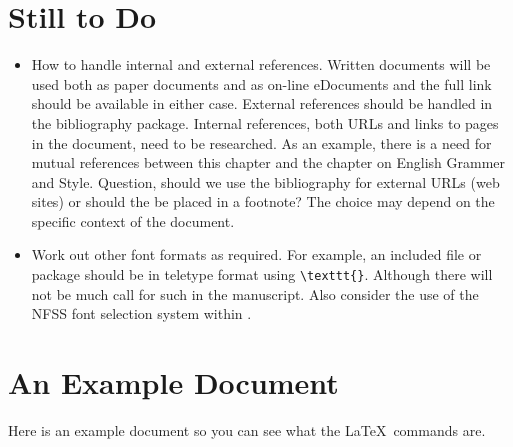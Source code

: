 \section{Still to Do}

\begin{itemize}

\item How to handle internal and external references.  Written
  documents will be used both as paper documents and as on-line
  eDocuments and the full link should be available in either
  case. External references should be handled in the bibliography
  package. Internal references, both URLs and links to pages in the
  document, need to be researched.  As an example,
  there is a need for mutual references between this chapter and the
  chapter on English Grammer and Style. Question, should we use
  the bibliography for external URLs (web sites) or should the
  be placed in a footnote?  The choice may depend on the specific
  context of the document.

\item Work out other font formats as required. For example, an included
  file or package should be in teletype format using \verb|\texttt{}|.
  Although there will not be much call for such in the manuscript. Also
  consider the use of the NFSS font selection system within \LaTeXe.

\end{itemize}

\section{An Example Document}

Here is an example document so you can see what the \LaTeX\ commands are.

